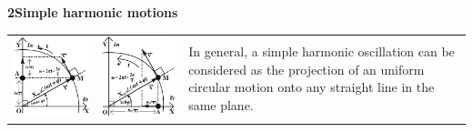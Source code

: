 \documentclass[a4paper,12pt,oneside]{report}
\newenvironment{tree}[4]{
\begin{list}{#1}{\parskip=0in \topsep=0in \itemsep=0in \parsep=0in \partopsep=0in \leftmargin=#2 \rightmargin=#3 \itemindent=#4 \listparindent=\itemindent}
}{\end{list}}
\newenvironment{ssection}[5]{
\phantom{#1}\textbf{#2\space#3}
\begin{tree}{#4}{0in}{0in}{#5}
}{\end{tree}}
\begin{document}
\begin{ssection}{\space}{2}{Simple harmonic motions}{\textbullet}{\parindent}
\begin{tabular}{ccp{}}
\includegraphics[scale=1.4]{figures/1Dec2.pdf}
&\includegraphics[scale=1.4]{figures/1Dec1.pdf}
&\begin{minipage}[b]{0.175\textwidth}
In general, a simple harmonic oscillation can be considered as the projection of an uniform circular motion onto any straight line in the same plane.\vspace{1in}
\end{minipage}
\end{tabular}
\end{ssection}\
\end{document}
